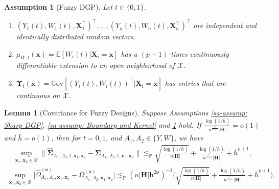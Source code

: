 \documentclass[10pt,a4paper]{amsart}
\newtheorem{assumption}{Assumption}
\newtheorem{lem}{Lemma}
\newcommand{\B}{\mathcal{B}}
\newcommand{\Cov}{\mathbb{C}\mathrm{ov}}
\newcommand{\E}{\mathbb{E}}
\newcommand{\X}{\mathcal{X}}
\newcommand{\bH}{\mathbf{H}}
\newcommand{\bSigma}{\boldsymbol{\Sigma}}
\newcommand{\bUpsilon}{\boldsymbol{\Upsilon}}
\newcommand{\bX}{\mathbf{X}}
\newcommand{\bh}{\mathbf{h}}
\newcommand{\bnu}{\boldsymbol{\nu}}
\newcommand{\bx}{\mathbf{x}}
\newcommand{\lessp}{\lesssim_{\mathbb{P}}}
\begin{document}
\begin{assumption}[Fuzzy DGP]\label{sa-assump: Fuzzy DGP}
    Let $t\in\{0,1\}$.
    \begin{enumerate}[label=\normalfont(\roman*),noitemsep,leftmargin=*]

    \item $(Y_1(t), W_1(t), \bX_1^\top)^\top,\ldots, (Y_n(t), W_n(t), \bX_n^\top)^\top$ are independent and identically distributed random vectors.

    \item $\mu_{W,t}(\bx) = \E[W_i(t)| \bX_i = \bx]$ has a $(p+1)$-times continuously differentiable extension to an open neighborhood of $\X$.

    \item $\bUpsilon_{t}(\bx) = \Cov[(Y_i(t), W_i(t))^{\top}|\bX_i = \bx]$ has entries that are continuous on $\X$.

    \end{enumerate}
\end{assumption}

\begin{lem}[Covariance for Fuzzy Designs]\label{sa-lem: covariance for fuzzy designs}
    Suppose Assumptions \ref{sa-assump: Sharp DGP}, \ref{sa-assump: Boundary and Kernel} and \ref{sa-assump: Fuzzy DGP} hold. If $\frac{\log(1/\bar{h})}{n^{\frac{v}{2+v}} |\bH|} = o(1)$ and $\bar{h}=o(1)$, then for $t = 0,1$, and $A_1, A_2 \in \{Y, W\}$, we have
    \begin{align*}
        \sup_{\bx_1,\bx_2 \in \B} \big\|\widehat{\bSigma}_{A_1,A_2,t,\bx_1,\bx_2} - \bSigma_{A_1,A_2,t,\bx_1,\bx_2}\big\|
        \lessp \sqrt{\frac{\log(1/\bar{h})}{n |\bH|}} + \frac{\log(1/\bar{h})}{n^{\frac{v}{2+v}}|\bH|} + \bar{h}^{p+1},
    \end{align*}
    \begin{align*}
        \sup_{\bx_1,\bx_2 \in \B} \big|\widehat{\Omega}_{A_1, A_2, \bx_1,\bx_2}^{(\bnu)} - \Omega_{A_1, A_2, \bx_1,\bx_2}^{(\bnu)}\big|
        \lessp (n |\bH|\bh^{2\bnu})^{-1}\bigg(\sqrt{\frac{\log(1/\bar{h})}{n |\bH|}} + \frac{\log(1/\bar{h})}{n^{\frac{v}{2+v}}|\bH|}+ \bar{h}^{p+1}\bigg),
    \end{align*}
\end{lem}
\end{document}
